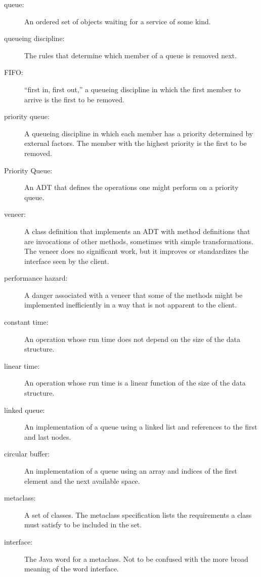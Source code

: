 \begin{description}

\item[queue:]  An ordered set of objects waiting for a service of
some kind.

\item[queueing discipline:]  The rules that determine which member
of a queue is removed next.

\item[FIFO:]  ``first in, first out,'' a queueing discipline in which
the first member to arrive is the first to be removed.

\item[priority queue:]  A queueing discipline in which
each member has a priority determined by external factors.
The member with the highest priority is the first to be removed.

\item[Priority Queue:]  An ADT that defines the operations one
might perform on a priority queue.

\item[veneer:]  A class definition that implements an ADT with
method definitions that are invocations of other methods, sometimes
with simple transformations.  The veneer does no significant work,
but it improves or standardizes the interface seen by the client.

\item[performance hazard:]  A danger associated with a veneer that
some of the methods might be implemented inefficiently in a way
that is not apparent to the client.

\item[constant time:]  An operation whose run time does not
depend on the size of the data structure.

\item[linear time:]  An operation whose run time is a linear
function of the size of the data structure.

\item[linked queue:]  An implementation of a queue using a linked
list and references to the first and last nodes.

\item[circular buffer:]  An implementation of a queue using an
array and indices of the first element and the next available space.

\item[metaclass:]  A set of classes.  The metaclass specification
lists the requirements a class must satisfy to be included in the set.

\item[interface:]  The Java word for a metaclass.  Not to be
confused with the more broad meaning of the word interface.


\end{description}


